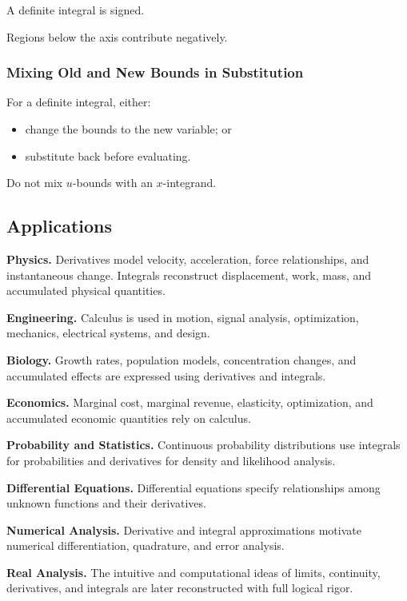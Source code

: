 A definite integral is signed.

Regions below the axis contribute negatively.

\subsubsection{Mixing Old and New Bounds in Substitution}

For a definite integral, either:

\begin{itemize}
    \item change the bounds to the new variable; or
    \item substitute back before evaluating.
\end{itemize}

Do not mix \(u\)-bounds with an \(x\)-integrand.

\subsection{Applications}
\label{subsec:single-variable-applications}

\begin{applicationbox}
\textbf{Physics.}
Derivatives model velocity, acceleration, force relationships, and
instantaneous change. Integrals reconstruct displacement, work, mass, and
accumulated physical quantities.

\medskip

\textbf{Engineering.}
Calculus is used in motion, signal analysis, optimization, mechanics,
electrical systems, and design.

\medskip

\textbf{Biology.}
Growth rates, population models, concentration changes, and accumulated
effects are expressed using derivatives and integrals.

\medskip

\textbf{Economics.}
Marginal cost, marginal revenue, elasticity, optimization, and accumulated
economic quantities rely on calculus.

\medskip

\textbf{Probability and Statistics.}
Continuous probability distributions use integrals for probabilities and
derivatives for density and likelihood analysis.

\medskip

\textbf{Differential Equations.}
Differential equations specify relationships among unknown functions and
their derivatives.

\medskip

\textbf{Numerical Analysis.}
Derivative and integral approximations motivate numerical differentiation,
quadrature, and error analysis.

\medskip

\textbf{Real Analysis.}
The intuitive and computational ideas of limits, continuity, derivatives,
and integrals are later reconstructed with full logical rigor.
\end{applicationbox}

